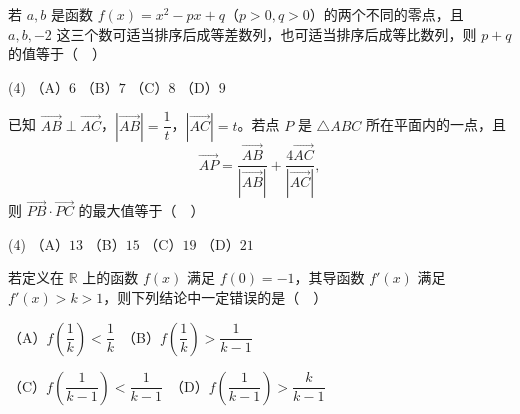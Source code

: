\begin{question}
若 $a,b$ 是函数 $f(x)=x^2-px+q$（$p>0,q>0$）的两个不同的零点，且 $a,b,-2$ 这三个数可适当排序后成等差数列，也可适当排序后成等比数列，则 $p+q$ 的值等于（　）

\begin{gkopts}(4)
\task （A）$6$
\task （B）$7$
\task （C）$8$
\task （D）$9$
\end{gkopts}

\end{question}
\begin{question}
已知 $\overrightarrow{AB}\perp\overrightarrow{AC}$，$|\overrightarrow{AB}|=\dfrac1t$，$|\overrightarrow{AC}|=t$。若点 $P$ 是 $\triangle ABC$ 所在平面内的一点，且
\nopagebreak[4]
\[
\overrightarrow{AP}=\frac{\overrightarrow{AB}}{|\overrightarrow{AB}|}+\frac{4\overrightarrow{AC}}{|\overrightarrow{AC}|},
\]
则 $\overrightarrow{PB}\cdot\overrightarrow{PC}$ 的最大值等于（　）

\begin{gkopts}(4)
\task （A）$13$
\task （B）$15$
\task （C）$19$
\task （D）$21$
\end{gkopts}

\end{question}
\begin{question}
若定义在 $\mathbb{R}$ 上的函数 $f(x)$ 满足 $f(0)=-1$，其导函数 $f'(x)$ 满足 $f'(x)>k>1$，则下列结论中一定错误的是（　）

（A）$f\!\left(\dfrac1k\right)<\dfrac1k$　（B）$f\!\left(\dfrac1k\right)>\dfrac1{k-1}$

（C）$f\!\left(\dfrac1{k-1}\right)<\dfrac1{k-1}$　（D）$f\!\left(\dfrac1{k-1}\right)>\dfrac{k}{k-1}$

\end{question}

